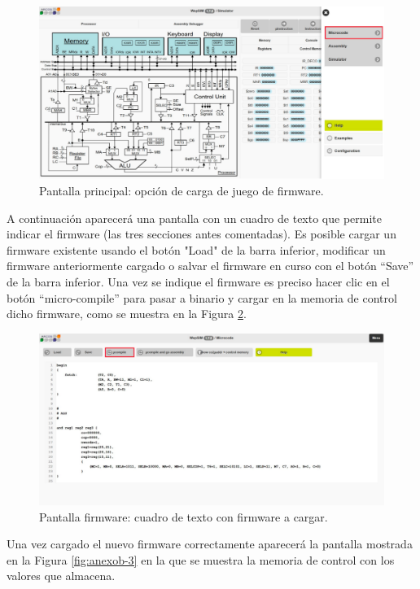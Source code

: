 \begin{figure}[htbp]
 	\centering
 	\includegraphics[width=15cm]{figures/anexob-1}
 	\caption{Pantalla principal: opción de carga de juego de firmware.}
	\label{fig:anexob-1}
\end{figure}

A continuación aparecerá una pantalla con un cuadro de texto que permite indicar el firmware (las tres secciones antes comentadas). Es posible cargar un firmware existente usando el botón "Load" de la barra inferior, modificar un firmware anteriormente cargado o salvar el firmware en curso con el botón ``Save'' de la barra inferior. Una vez se indique el firmware es preciso hacer clic en el botón ``micro-compile'' para pasar a binario y cargar en la memoria de control dicho firmware, como se muestra en la Figura \ref{fig:anexob-2}.

\begin{figure}[htbp]
 	\centering
 	\includegraphics[width=15cm]{figures/anexob-2}
 	\caption{Pantalla firmware: cuadro de texto con firmware a cargar.}
	\label{fig:anexob-2}
\end{figure}

Una vez cargado el nuevo firmware correctamente aparecerá la pantalla mostrada en la Figura \ref{fig:anexob-3} en la que se muestra la memoria de control con los valores que almacena.

